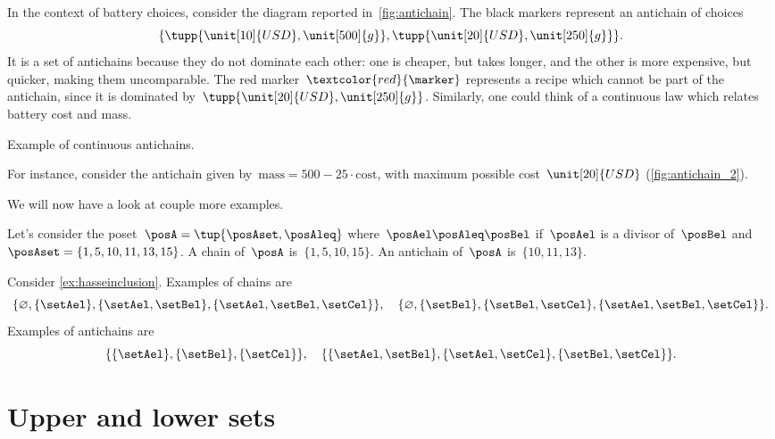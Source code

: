 In the context of battery choices, consider the diagram reported in~\cref{fig:antichain}.
The black markers represent an antichain of choices
\begin{equation}\{
    \tupp{\unit[10]{USD},\unit[500]{g}},
    \tupp{\unit[20]{USD},\unit[250]{g}}\}.
\end{equation}
It is a set of antichains because they do not dominate each other: one is cheaper, but takes longer, and the other is more expensive, but quicker, making them uncomparable.
The red marker~$\textcolor{red}{\marker}$ represents a recipe which cannot be part of the antichain, since it is dominated by~$\tupp{\unit[20]{USD},\unit[250]{g}}$.
Similarly, one could think of a continuous law which relates battery cost and mass.
%
\begin{marginfigure}
    \centering
    \caption{Example of continuous antichains.}
    \label{fig:antichain_2}
\end{marginfigure}
%
For instance, consider the antichain given by~$\text{mass}=500-25\cdot \text{cost}$, with maximum possible cost~$\unit[20]{USD}$ (\cref{fig:antichain_2}).

We will now have a look at couple more examples.
\begin{example}
    Let's consider the poset~$\posA=\tup{\posAset,\posAleq}$ where~$\posAel \posAleq \posBel$ if~$\posAel$ is a divisor of~$\posBel$ and~$\posAset=\{1,5,10,11,13,15\}$.
    A chain of~$\posA$ is~$\{1,5,10,15\}$.
    An antichain of~$\posA$ is~$\{10,11,13\}$.
\end{example}

\begin{example}
    Consider \cref{ex:hasseinclusion}.
    Examples of chains are
    \begin{equation}
        \{\varnothing,\{\setAel\},\{\setAel,\setBel\},\{\setAel,\setBel,\setCel\}\}, \quad  \{\varnothing,\{\setBel\},\{\setBel,\setCel\},\{\setAel,\setBel,\setCel\}\}.
    \end{equation}
    Examples of antichains are
    \begin{equation}
        \{\{\setAel\},\{\setBel\},\{\setCel\}\}, \quad \{ \{\setAel,\setBel\},\{\setAel,\setCel\}, \{\setBel,\setCel\}\}.
    \end{equation}
\end{example}

\section{Upper and lower sets}
\label{sec:UpperLowerSets}

